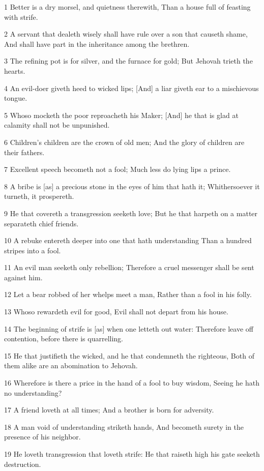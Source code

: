 \par 1 Better is a dry morsel, and quietness therewith, Than a house full of feasting with strife.
\par 2 A servant that dealeth wisely shall have rule over a son that causeth shame, And shall have part in the inheritance among the brethren.
\par 3 The refining pot is for silver, and the furnace for gold; But Jehovah trieth the hearts.
\par 4 An evil-doer giveth heed to wicked lips; [And] a liar giveth ear to a mischievous tongue.
\par 5 Whoso mocketh the poor reproacheth his Maker; [And] he that is glad at calamity shall not be unpunished.
\par 6 Children's children are the crown of old men; And the glory of children are their fathers.
\par 7 Excellent speech becometh not a fool; Much less do lying lips a prince.
\par 8 A bribe is [as] a precious stone in the eyes of him that hath it; Whithersoever it turneth, it prospereth.
\par 9 He that covereth a transgression seeketh love; But he that harpeth on a matter separateth chief friends.
\par 10 A rebuke entereth deeper into one that hath understanding Than a hundred stripes into a fool.
\par 11 An evil man seeketh only rebellion; Therefore a cruel messenger shall be sent against him.
\par 12 Let a bear robbed of her whelps meet a man, Rather than a fool in his folly.
\par 13 Whoso rewardeth evil for good, Evil shall not depart from his house.
\par 14 The beginning of strife is [as] when one letteth out water: Therefore leave off contention, before there is quarrelling.
\par 15 He that justifieth the wicked, and he that condemneth the righteous, Both of them alike are an abomination to Jehovah.
\par 16 Wherefore is there a price in the hand of a fool to buy wisdom, Seeing he hath no understanding?
\par 17 A friend loveth at all times; And a brother is born for adversity.
\par 18 A man void of understanding striketh hands, And becometh surety in the presence of his neighbor.
\par 19 He loveth transgression that loveth strife: He that raiseth high his gate seeketh destruction.
